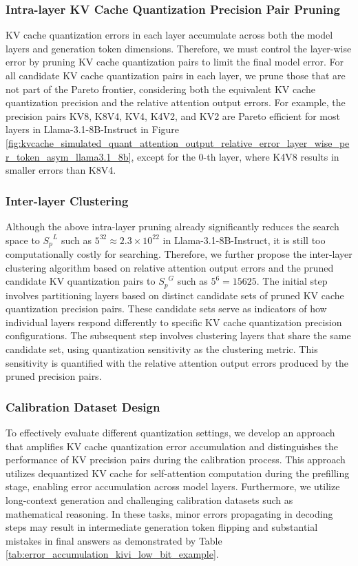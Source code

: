 \subsubsection*{Intra-layer KV Cache Quantization Precision Pair Pruning}
KV cache quantization errors in each layer accumulate across both the model layers and generation token dimensions. Therefore, we must control the layer-wise error by pruning KV cache quantization pairs to limit the final model error. For all candidate KV cache quantization pairs in each layer, we prune those that are not part of the Pareto frontier, considering both the equivalent KV cache quantization precision and the relative attention output errors. For example, the precision pairs KV8, K8V4, KV4, K4V2, and KV2 are Pareto efficient for most layers in Llama-3.1-8B-Instruct in Figure \ref{fig:kvcache_simulated_quant_attention_output_relative_error_layer_wise_per_token_asym_llama3.1_8b}, except for the 0-th layer, where K4V8 results in smaller errors than K8V4.

\subsubsection*{Inter-layer Clustering}
Although the above intra-layer pruning already significantly reduces the search space to ${S_p}^L$ such as $5^{32} \approx 2.3\times 10^{22}$ in Llama-3.1-8B-Instruct, it is still too computationally costly for searching. Therefore, we further propose the inter-layer clustering algorithm based on relative attention output errors and the pruned candidate KV quantization pairs to ${S_p}^{G}$ such as $5^6=15625$.
The initial step involves partitioning layers based on distinct candidate sets of pruned KV cache quantization precision pairs. These candidate sets serve as indicators of how individual layers respond differently to specific KV cache quantization precision configurations.
The subsequent step involves clustering layers that share the same candidate set, using quantization sensitivity as the clustering metric. This sensitivity is quantified with the relative attention output errors produced by the pruned precision pairs.

\subsubsection*{Calibration Dataset Design}
To effectively evaluate different quantization settings, we develop an approach that amplifies KV cache quantization error accumulation and distinguishes the performance of KV precision pairs during the calibration process. This approach utilizes dequantized KV cache for self-attention computation during the prefilling stage, enabling error accumulation across model layers. 
Furthermore, we utilize long-context generation and challenging calibration datasets such as mathematical reasoning. 
In these tasks, minor errors propagating in decoding steps may result in intermediate generation token flipping and substantial mistakes in final answers as demonstrated by Table \ref{tab:error_accumulation_kivi_low_bit_example}.